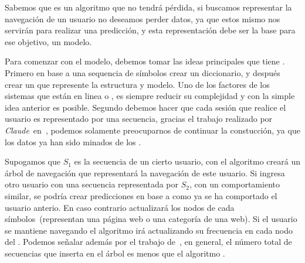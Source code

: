 % 
% 




Sabemos que \lzSieteOcho es un algoritmo que no tendrá pérdida, si buscamos representar la navegación de un usuario no deseamos perder datos, ya que estos mismo nos servirán para realizar una predicción, y esta representación debe ser la base para ese objetivo, un modelo.

Para comenzar con el modelo, debemos tomar las ideas principales que tiene \lzSieteOcho. Primero en base a una sequencia de símbolos crear un diccionario, y después crear un \trie que represente la estructura y modelo. Uno de los factores de los sistemas que están en linea o \webs, es siempre reducir su complejidad y con la simple idea anterior es posible. Segundo debemos hacer que cada sesión que realice el usuario es representado por una secuencia, gracias el trabajo realizado por \emph{Claude}~\etal en~\cite{Claude2014}, podemos solamente preocuparnos de continuar la constucción, ya que los datos ya han sido minados de los \webasccesslog.



Supogamos que $S_{1}$ es la secuencia de un cierto usuario, con el  algoritmo \lzSieteOcho creará un árbol de navegación que representará la navegación de este usuario. Si ingresa otro usuario con una secuencia representada por $S_{2}$, con un comportamiento similar, se podría crear predicciones en base a como ya se ha comportado el usuario anterio. En caso contrario actualizará los nodos de cada símbolos~(representan una página web o una categoría de una web). Si el usuario se mantiene navegando el algoritmo irá actualizando su frecuencia en cada nodo del \trie. Podemos señalar además por el trabajo de~\cite{Begleiter2004}, en general, el número total de secuencias que inserta en el árbol es menos que el algoritmo \PPM.  







